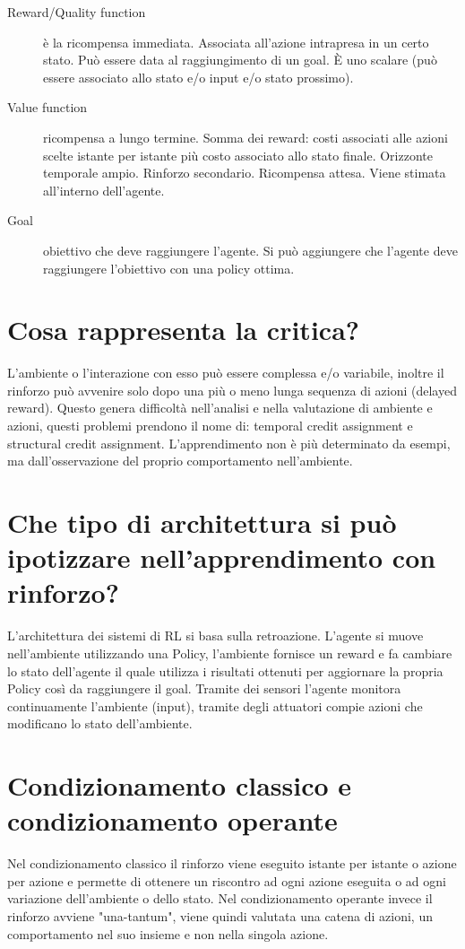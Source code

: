 \documentclass[\main/main.tex]{subfiles}
\begin{document}
\begin{description}
\item [Reward/Quality function] è la ricompensa immediata. Associata all’azione intrapresa in un certo stato. Può essere data al raggiungimento di un goal. È uno scalare (può essere associato allo stato e/o input e/o stato prossimo).
\item [Value function] ricompensa a lungo termine. Somma dei reward: costi associati alle azioni scelte istante per istante più costo associato allo stato finale. Orizzonte temporale ampio. Rinforzo secondario. Ricompensa attesa. Viene stimata all’interno dell’agente.
\item [Goal] obiettivo che deve raggiungere l’agente. Si può aggiungere che l’agente deve raggiungere l’obiettivo con una policy ottima.
\end{description}

\section{Cosa rappresenta la critica?}
L'ambiente o l'interazione con esso può essere complessa e/o variabile, inoltre il rinforzo può avvenire solo dopo una più o meno lunga sequenza di azioni (delayed reward).
Questo genera difficoltà nell'analisi e nella valutazione di ambiente e azioni, questi problemi prendono il nome di: temporal credit assignment e structural credit assignment.
L'apprendimento non è più determinato da esempi, ma dall'osservazione del proprio comportamento nell'ambiente.

\section{Che tipo di architettura si può ipotizzare nell'apprendimento con rinforzo?}
L'architettura dei sistemi di RL si basa sulla retroazione. L'agente si muove nell'ambiente utilizzando una Policy, l'ambiente fornisce un reward e fa cambiare lo stato dell'agente il quale utilizza i risultati ottenuti per aggiornare la propria Policy così da raggiungere il goal.
Tramite dei sensori l'agente monitora continuamente l'ambiente (input), tramite degli attuatori compie azioni che modificano lo stato dell'ambiente.

\section{Condizionamento classico e condizionamento operante}
Nel condizionamento classico il rinforzo viene eseguito istante per istante o azione per azione e permette di ottenere un riscontro ad ogni azione eseguita o ad ogni variazione dell'ambiente o dello stato.
Nel condizionamento operante invece il rinforzo avviene "una-tantum", viene quindi valutata una catena di azioni, un comportamento nel suo insieme e non nella singola azione.
\end{document}
